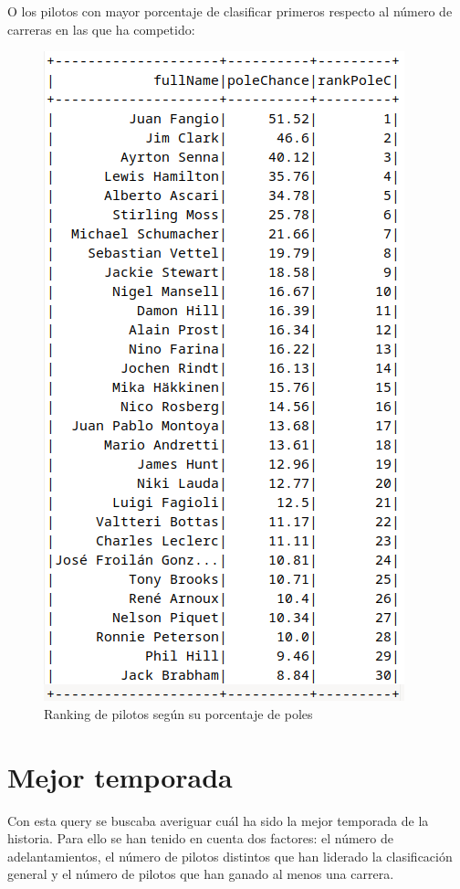 \documentclass[12pt,twoside,titlepage]{report}
\begin{document}
O los pilotos con mayor porcentaje de clasificar primeros respecto al número de carreras en las que ha competido:

\begin{figure}[H]
	\includegraphics[scale=0.3]{results/bestdrivers/polechance.png}
	\centering
	\caption{Ranking de pilotos según su porcentaje de poles}
	\label{fig:poleChance}
	\centering
\end{figure}

\section{Mejor temporada}

Con esta query se buscaba averiguar cuál ha sido la mejor temporada de la historia. Para ello se han tenido en cuenta dos factores: el número de adelantamientos, el número de pilotos distintos que han liderado la clasificación general y el número de pilotos que han ganado al menos una carrera.
\end{document}
